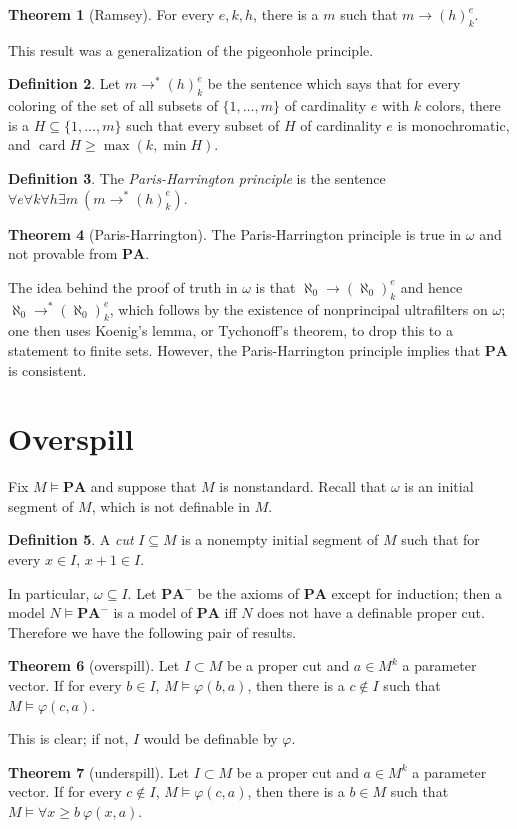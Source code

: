 \documentclass[12pt]{report}
\newcommand{\card}{\operatorname{card}}
\newcommand{\PA}{\mathbf{PA}}
\newcommand{\dfn}[1]{\emph{#1}\index{#1}}
\theoremstyle{definition}
\newtheorem{theorem}{Theorem}[chapter]
\newtheorem{definition}[theorem]{Definition}
\begin{document}
\begin{theorem}[Ramsey]
For every $e,k,h$, there is a $m$ such that $m \to (h)_k^e$.
\end{theorem}
This result was a generalization of the pigeonhole principle.

\begin{definition}
Let $m \to^* (h)_k^e$ be the sentence which says that for every coloring of the set of all subsets of $\{1, \dots, m\}$ of cardinality $e$ with $k$ colors, there is a $H \subseteq \{1, \dots, m\}$ such that every subset of $H$ of cardinality $e$ is monochromatic, and $\card H \geq \max(k, \min H)$.
\end{definition}

\begin{definition}
The \dfn{Paris-Harrington principle} is the sentence $\forall e\forall k \forall h \exists m~(m \to^* (h)_k^e)$.
\end{definition}

\begin{theorem}[Paris-Harrington]
The Paris-Harrington principle is true in $\omega$ and not provable from $\PA$.
\end{theorem}
The idea behind the proof of truth in $\omega$ is that $\aleph_0 \to (\aleph_0)_k^e$ and hence $\aleph_0 \to^* (\aleph_0)^e_k$, which follows by the existence of nonprincipal ultrafilters on $\omega$; one then uses Koenig's lemma, or Tychonoff's theorem, to drop this to a statement to finite sets. However, the Paris-Harrington principle implies that $\PA$ is consistent.

\section{Overspill}
Fix $M \models \PA$ and suppose that $M$ is nonstandard. Recall that $\omega$ is an initial segment of $M$, which is not definable in $M$.

\begin{definition}
A \dfn{cut} $I \subseteq M$ is a nonempty initial segment of $M$ such that for every $x \in I$, $x + 1 \in I$.
\end{definition}
In particular, $\omega \subseteq I$. Let $\PA^-$ be the axioms of $\PA$ except for induction; then a model $N \models \PA^-$ is a model of $\PA$ iff $N$ does not have a definable proper cut. Therefore we have the following pair of results.

\begin{theorem}[overspill]
Let $I \subset M$ be a proper cut and $a \in M^k$ a parameter vector. If for every $b \in I$, $M \models \varphi(b, a)$, then there is a $c \notin I$ such that $M \models \varphi(c, a)$.
\end{theorem}
This is clear; if not, $I$ would be definable by $\varphi$.
\begin{theorem}[underspill]
Let $I \subset M$ be a proper cut and $a \in M^k$ a parameter vector. If for every $c \notin I$, $M \models \varphi(c, a)$, then there is a $b \in M$ such that $M \models \forall x \geq b~\varphi(x,a)$.
\end{theorem}
\end{document}
